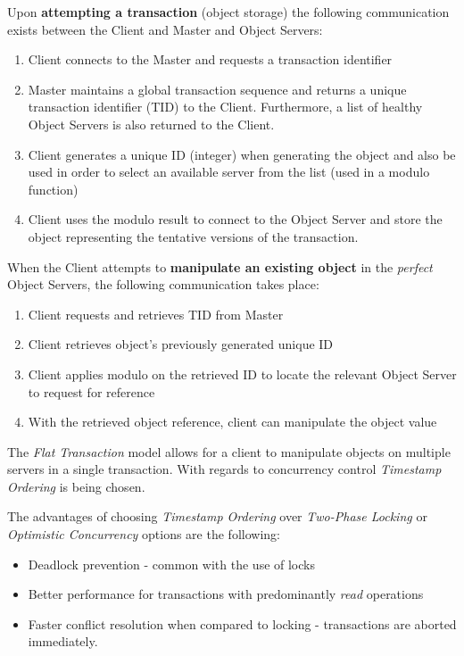 \documentclass[times, 10pt,twocolumn]{article}
\begin{document}
Upon {\bf attempting a transaction} (object storage) the following communication exists between the Client and Master and Object Servers: 

\begin{enumerate}
\item Client connects to the Master and requests a transaction identifier 
\item Master maintains a global transaction sequence and returns a unique transaction identifier (TID) to the Client. Furthermore, a list of healthy Object Servers is also returned to the Client. 
\item Client generates a unique ID (integer) when generating the object and also be used in order to select an available server from the list (used in a modulo function)
\item Client uses the modulo result to connect to the Object Server and store the object representing the tentative versions of the transaction.
\end{enumerate}

When the Client attempts to {\bf manipulate an existing object} in the {\it perfect} Object Servers, the following communication takes place:
\begin{enumerate}
\item Client requests and retrieves TID from Master
\item Client retrieves object's previously generated unique ID
\item Client applies modulo on the retrieved ID to locate the relevant Object Server to request for reference
\item With the retrieved object reference, client can manipulate the object value
\end{enumerate}

\label{subsec:transmgt}
The {\it Flat Transaction} model allows for a client to manipulate objects on multiple servers in a single transaction. With regards to concurrency control {\it Timestamp Ordering} is being chosen.

The advantages of choosing {\it Timestamp Ordering} over {\it Two-Phase Locking} or {\it Optimistic Concurrency} options are the following: 
\begin{itemize}
\item Deadlock prevention - common with the use of locks
\item Better performance for transactions with predominantly {\it read} operations \cite{bernstein1987concurrency}
\item Faster conflict resolution when compared to locking - transactions are aborted immediately. 
\end{itemize}
\end{document}
